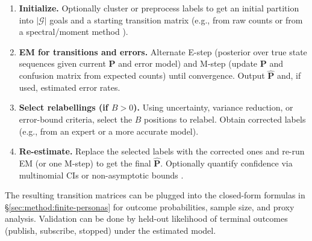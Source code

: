 \begin{enumerate}
  \item \textbf{Initialize.} Optionally cluster or preprocess labels to get an initial partition into $|\mathcal{G}|$ goals and a starting transition matrix (e.g., from raw counts or from a spectral/moment method \citep{zhang2016spectral}).
  \item \textbf{EM for transitions and errors.} Alternate E-step (posterior over true state sequences given current $\mathbf{P}$ and error model) and M-step (update $\mathbf{P}$ and confusion matrix from expected counts) until convergence. Output $\widehat{\mathbf{P}}$ and, if used, estimated error rates.
  \item \textbf{Select relabellings (if $B > 0$).} Using uncertainty, variance reduction, or error-bound criteria, select the $B$ positions to relabel. Obtain corrected labels (e.g., from an expert or a more accurate model).
  \item \textbf{Re-estimate.} Replace the selected labels with the corrected ones and re-run EM (or one M-step) to get the final $\widehat{\mathbf{P}}$. Optionally quantify confidence via multinomial CIs or non-asymptotic bounds \citep{noe2009estimating, huang2024nonasymptotic}.
\end{enumerate}

The resulting transition matrices can be plugged into the closed-form formulas in \S\ref{sec:method:finite-personas} for outcome probabilities, sample size, and proxy analysis. Validation can be done by held-out likelihood of terminal outcomes (publish, subscribe, stopped) under the estimated model.
